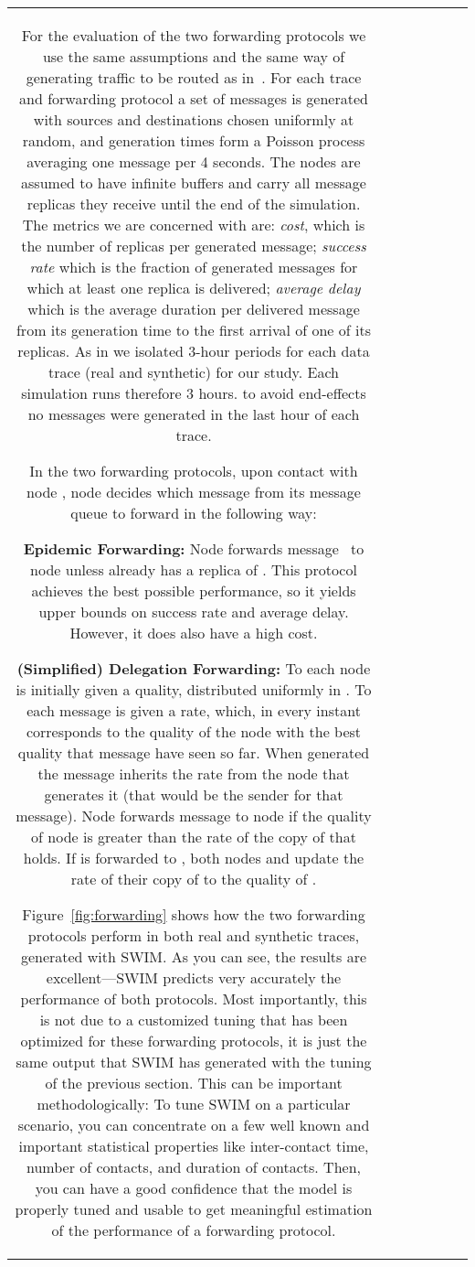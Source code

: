 \documentclass[conference]{IEEEtran}
\begin{document}
\begin{table*}
\begin{center}
\begin{tabular}{|c|c|c|c|c|c|c|}
For the evaluation of the two forwarding protocols we use the same assumptions
and the same way of generating traffic to be routed as in~\cite{dfw08}.
For each trace and forwarding protocol a set of messages is generated with
sources and destinations chosen uniformly at random, and generation times form a
Poisson process averaging one message per 4 seconds.
The nodes are assumed to have infinite buffers and carry all message replicas
they receive until the end of the simulation. The metrics we are concerned with
are: \emph{cost}, which is the number of replicas per generated message;
\emph{success rate} which is the fraction of generated messages for which at
least one replica is delivered; \emph{average delay} which is the average
duration per delivered message from its generation time to the first arrival of
one of its replicas.
As in \cite{dfw08} we isolated 3-hour periods for each data trace (real and
synthetic) for our study. Each simulation runs therefore 3 hours. to avoid
end-effects no messages were generated in the last hour of each trace.

In the two forwarding protocols, upon contact with node , node  decides
which message from its message queue to forward in the following way:
\begin{trivlist}
\item
\textbf{Epidemic Forwarding:} Node  forwards message~ to node  unless
 already has a replica of . This protocol achieves the best possible
performance, so it yields upper bounds on success rate and average delay.
However, it does also have a high cost.
\item
\textbf{(Simplified) Delegation Forwarding:} To each node is initially given a
quality, distributed uniformly in . To each message is given a rate,
which, in every instant corresponds to the quality of the node with the best
quality that message have seen so far. When generated the message inherits the
rate from the node that generates it (that would be the sender for that
message). Node  forwards message  to node  if the quality of node 
is greater than the rate of the copy of  that  holds. If  is forwarded
to , both nodes  and  update the rate of their copy of  to the
quality of .
\end{trivlist}

Figure~\ref{fig:forwarding} shows how the two forwarding protocols perform in
both real and synthetic traces, generated with SWIM.
As you can see, the results are excellent---SWIM predicts very accurately the
performance of both protocols. Most importantly, this is not due to a customized
tuning that has been optimized for these forwarding protocols, it is just the
same output that SWIM has generated with the tuning of the previous section.
This can be important methodologically: To tune SWIM on a particular scenario,
you can concentrate on a few well known and important statistical properties
like inter-contact time, number of contacts, and duration of contacts. Then, you
can have a good confidence that the model is properly tuned and usable to get
meaningful estimation of the performance of a forwarding protocol.


\end{tabular}
\end{center}
\end{table*}
\end{document}
